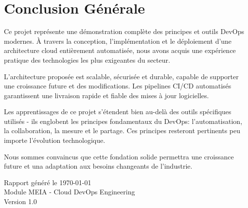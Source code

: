 \documentclass[12pt,a4paper,twoside]{report}
\begin{document}
\newpage

\chapter*{Conclusion Générale}

Ce projet représente une démonstration complète des principes et outils DevOps modernes. À travers la conception, l'implémentation et le déploiement d'une architecture cloud entièrement automatisée, nous avons acquis une expérience pratique des technologies les plus exigeantes du secteur.

\vspace{1cm}

L'architecture proposée est scalable, sécurisée et durable, capable de supporter une croissance future et des modifications. Les pipelines CI/CD automatisés garantissent une livraison rapide et fiable des mises à jour logicielles.

\vspace{1cm}

Les apprentissages de ce projet s'étendent bien au-delà des outils spécifiques utilisés - ils englobent les principes fondamentaux du DevOps: l'automatisation, la collaboration, la mesure et le partage. Ces principes resteront pertinents peu importe l'évolution technologique.

\vspace{1cm}

Nous sommes convaincus que cette fondation solide permettra une croissance future et una adaptation aux besoins changeants de l'industrie.

\newpage

\begin{flushright}
    \large
    Rapport généré le \today\\
    Module MEIA - Cloud DevOps Engineering\\
    Version 1.0
\end{flushright}
\end{document}
